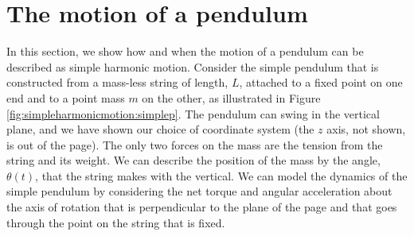 \section{The motion of a pendulum}
In this section, we show how and when the motion of a pendulum can be described as simple harmonic motion. Consider the simple pendulum that is constructed from a mass-less string of length, $L$, attached to a fixed point on one end and to a point mass $m$ on the other, as illustrated in Figure \ref{fig:simpleharmonicmotion:simplep}.
The pendulum can swing in the vertical plane, and we have shown our choice of coordinate system (the $z$ axis, not shown, is out of the page). The only two forces on the mass are the tension from the string and its weight. We can describe the position of the mass by the angle, $\theta(t)$, that the string makes with the vertical. We can model the dynamics of the simple pendulum by considering the net torque and angular acceleration about the axis of rotation that is perpendicular to the plane of the page and that goes through the point on the string that is fixed. 

